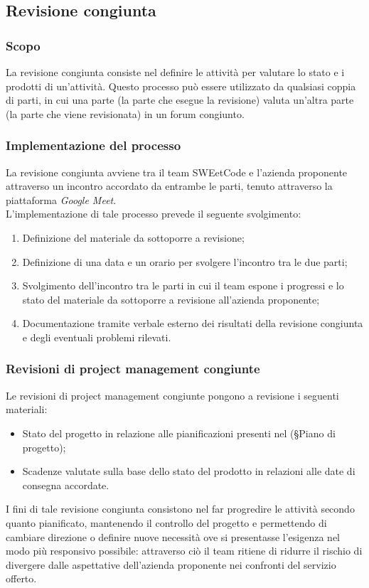 \documentclass[10pt, a4paper]{article}
\begin{document}
\subsection{Revisione congiunta}

\subsubsection{Scopo}
La revisione congiunta consiste nel definire le attività per valutare lo stato e i prodotti di un’attività. Questo processo può 
essere utilizzato da qualsiasi coppia di parti, in cui una parte (la parte che esegue la revisione) valuta un’altra parte (la parte che viene 
revisionata) in un forum congiunto.

\subsubsection{Implementazione del processo}
La revisione congiunta avviene tra il team SWEetCode e l'azienda proponente attraverso un incontro accordato da entrambe le parti, tenuto attraverso
la piattaforma \textit{Google Meet}.\\
L'implementazione di tale processo prevede il seguente svolgimento:
\begin{enumerate}
    \item Definizione del materiale da sottoporre a revisione;
    \item Definizione di una data e un orario per svolgere l'incontro tra le due parti;
    \item Svolgimento dell'incontro tra le parti in cui il team espone i progressi e lo stato del materiale da sottoporre a revisione all'azienda 
    proponente;
    \item Documentazione tramite verbale esterno dei risultati della revisione congiunta e degli eventuali problemi rilevati.
\end{enumerate}

\subsubsection{Revisioni di project management congiunte}
Le revisioni di project management congiunte pongono a revisione i seguenti materiali:
\begin{itemize}
    \item Stato del progetto in relazione alle pianificazioni presenti nel (\S Piano di progetto);
    \item Scadenze valutate sulla base dello stato del prodotto in relazioni alle date di consegna accordate.
\end{itemize}
I fini di tale revisione congiunta consistono nel far progredire le attività secondo quanto pianificato, mantenendo il controllo del progetto e 
permettendo di cambiare direzione o definire nuove necessità ove si presentasse l'esigenza nel modo più responsivo possibile: attraverso ciò il team
ritiene di ridurre il rischio di divergere dalle aspettative dell'azienda proponente nei confronti del servizio offerto.
\end{document}
